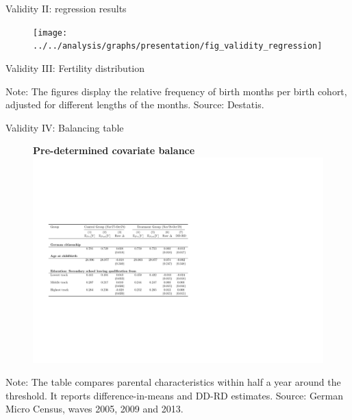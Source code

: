 \documentclass[aspectratio=169,handout]{beamer} %
\begin{document}
\begin{frame}{Validity II: regression results}
	\begin{figure}
		\texttt{[image: ../../analysis/graphs/presentation/fig\_validity\_regression]}
	\end{figure}
	
	\hyperlink{BACK_FROM_VALIDITY}{}
\end{frame}
\begin{frame}{Validity III: Fertility distribution}
\begin{figure}
\end{figure}
\begin{center}\vspace{-1em}
\tiny \flushleft Note:  The figures display the relative frequency of birth months per birth cohort, adjusted for different lengths of the months.  Source: Destatis.
\end{center}\hyperlink{BACK_FROM_VALIDITY}{}
\end{frame}
\begin{frame}{Validity IV: Balancing table}
\begin{figure}
\textbf{Pre-determined covariate balance}
\includegraphics[width=0.8\linewidth]{../../analysis/graphs/presentation/parental_covariate_balance}
\end{figure}
\begin{minipage}{0.9\linewidth}
\begin{center}\vspace{-1cm}
\tiny \flushleft Note: The table compares parental characteristics within half a year around the threshold. It reports difference-in-means and DD-RD estimates. Source: German Micro Census, waves 2005, 2009 and 2013. 
\end{center}
\end{minipage}

\hyperlink{BACK_FROM_VALIDITY}{}
\end{frame}
\end{document}
